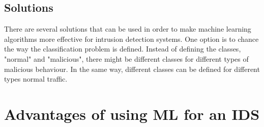 \subsection{Solutions}
There are several solutions that can be used in order to make machine learning algorithms more effective for intrusion detection systems. One option is to chance the way the classification problem is defined. Instead of defining the classes, "normal" and "malicious", there might be different classes for different types of malicious behaviour. In the same way, different classes can be defined for different types normal traffic. 

\section{Advantages of using ML for an IDS}

